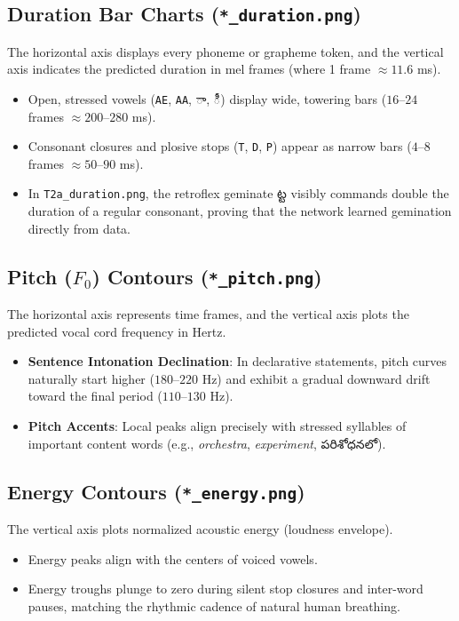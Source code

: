 \documentclass[11pt,a4paper]{article}
\newcommand{\te}[1]{{\telugufont #1}}
\begin{document}
\subsection{Duration Bar Charts (\texttt{*\_duration.png})}
The horizontal axis displays every phoneme or grapheme token, and the vertical axis indicates the predicted duration in mel frames (where 1 frame $\approx 11.6$ ms).
\begin{itemize}
  \item Open, stressed vowels (\texttt{AE}, \texttt{AA}, \te{ా}, \te{ీ}) display wide, towering bars ($16$--$24$ frames $\approx 200$--$280$ ms).
  \item Consonant closures and plosive stops (\texttt{T}, \texttt{D}, \texttt{P}) appear as narrow bars ($4$--$8$ frames $\approx 50$--$90$ ms).
  \item In \texttt{T2a\_duration.png}, the retroflex geminate \te{ట్ట} visibly commands double the duration of a regular consonant, proving that the network learned gemination directly from data.
\end{itemize}

\subsection{Pitch ($F_0$) Contours (\texttt{*\_pitch.png})}
The horizontal axis represents time frames, and the vertical axis plots the predicted vocal cord frequency in Hertz.
\begin{itemize}
  \item \textbf{Sentence Intonation Declination}: In declarative statements, pitch curves naturally start higher ($180$--$220$ Hz) and exhibit a gradual downward drift toward the final period ($110$--$130$ Hz).
  \item \textbf{Pitch Accents}: Local peaks align precisely with stressed syllables of important content words (e.g., \textit{orchestra}, \textit{experiment}, \te{పరిశోధనలో}).
\end{itemize}

\subsection{Energy Contours (\texttt{*\_energy.png})}
The vertical axis plots normalized acoustic energy (loudness envelope).
\begin{itemize}
  \item Energy peaks align with the centers of voiced vowels.
  \item Energy troughs plunge to zero during silent stop closures and inter-word pauses, matching the rhythmic cadence of natural human breathing.
\end{itemize}
\end{document}
